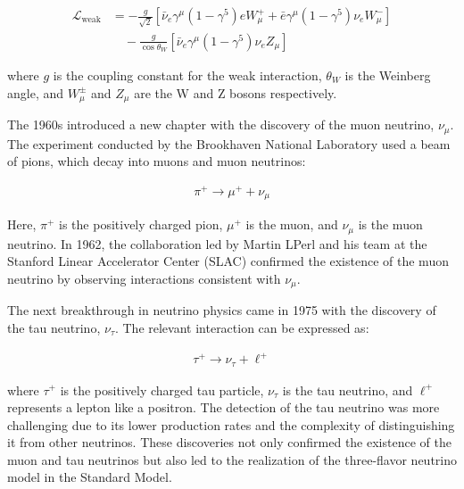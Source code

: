 \begin{align}
  \mathcal{L}_{\text{weak}} &= -\frac{g}{\sqrt{2}} \left[ \bar{\nu}_e \gamma^\mu (1 - \gamma^5) e W_\mu^+ + \bar{e} \gamma^\mu (1 - \gamma^5) \nu_e W_\mu^- \right] \nonumber \\
                            &\quad - \frac{g}{\cos \theta_W} \left[ \bar{\nu}_e \gamma^\mu (1 - \gamma^5) \nu_e Z_\mu \right]
\end{align}

where \( g \) is the coupling constant for the weak interaction, \( \theta_W \) is the Weinberg angle, and \( W_\mu^\pm \) and \( Z_\mu \) are the W and Z bosons respectively.

The 1960s introduced a new chapter with the discovery of the muon neutrino, $\nu_\mu$.
The experiment conducted by the Brookhaven National Laboratory used a beam of pions, which decay into muons and muon neutrinos:

\begin{align}
  \pi^+ \rightarrow \mu^+ + \nu_\mu
\end{align}

Here, $\pi^+$ is the positively charged pion, $\mu^+$ is the muon, and $\nu_\mu$ is the muon neutrino.
In 1962, the collaboration led by Martin LPerl and his team at the Stanford Linear Accelerator Center (SLAC) confirmed the existence of the muon neutrino by observing interactions consistent with $\nu_\mu$.

The next breakthrough in neutrino physics came in 1975 with the discovery of the tau neutrino, $\nu_\tau$.
The relevant interaction can be expressed as:

\begin{align}
  \tau^+ \rightarrow \nu_\tau + \ell^+
\end{align}

where $\tau^+$ is the positively charged tau particle, $\nu_\tau$ is the tau neutrino, and $\ell^+$ represents a lepton like a positron.
The detection of the tau neutrino was more challenging due to its lower production rates and the complexity of distinguishing it from other neutrinos.
These discoveries not only confirmed the existence of the muon and tau neutrinos but also led to the realization of the three-flavor neutrino model in the Standard Model.

